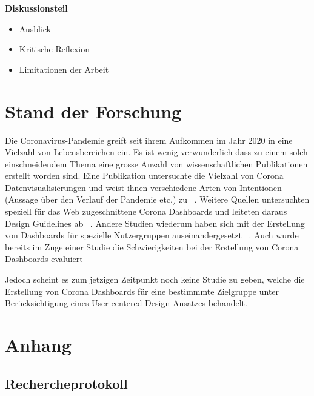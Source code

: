 \documentclass[12pt, oneside]{article}
\begin{document}
\textbf{Diskussionsteil}
\begin{itemize}
	\item Ausblick
	\item Kritische Reflexion
	\item Limitationen der Arbeit
\end{itemize}

\clearpage
\section{Stand der Forschung}
Die Coronavirus-Pandemie greift seit ihrem Aufkommen im Jahr 2020 in eine Vielzahl von Lebensbereichen ein. Es ist wenig verwunderlich dass zu einem solch einschneidendem Thema eine grosse Anzahl von wissenschaftlichen Publikationen erstellt worden sind. Eine Publikation untersuchte die Vielzahl von Corona Datenvisualisierungen und weist ihnen verschiedene Arten von Intentionen (Aussage über den Verlauf der Pandemie etc.) zu ~\citep{mapping_landscape_of_covid19_crisis_visualizations}. Weitere Quellen untersuchten speziell für das Web zugeschnittene Corona Dashboards und leiteten daraus Design Guidelines ab ~\citep{web_based_covid_dashboards}. Andere Studien wiederum haben sich mit der Erstellung von Dashboards für spezielle Nutzergruppen auseinandergesetzt ~\citep{design_and_validation_of_precooked_developer_dashboard}. Auch wurde bereits im Zuge einer Studie die Schwierigkeiten bei der Erstellung von Corona Dashboards evaluiert ~\citep{experience_dashboard_teams_during_pandemic}

Jedoch scheint es zum jetzigen Zeitpunkt noch keine Studie zu geben, welche die Erstellung von Corona Dashboards für eine bestimmmte Zielgruppe unter Berücksichtigung eines User-centered Design Ansatzes behandelt. 

\clearpage
\section*{Anhang}
\subsection*{Rechercheprotokoll}
\end{document}
